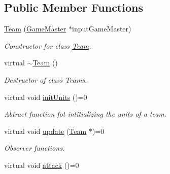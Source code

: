 \subsection*{Public Member Functions}
\begin{DoxyCompactItemize}
\item 
\hypertarget{class_team_a23a02be0438b0603c7f811a0605ce207}{}\hyperlink{class_team_a23a02be0438b0603c7f811a0605ce207}{Team} (\hyperlink{class_game_master}{Game\+Master} $\ast$input\+Game\+Master)\label{class_team_a23a02be0438b0603c7f811a0605ce207}

\begin{DoxyCompactList}\small\item\em Constructor for class \hyperlink{class_team}{Team}. \end{DoxyCompactList}\item 
\hypertarget{class_team_ab4218fddd612d52bab47bec4feeb49de}{}virtual \hyperlink{class_team_ab4218fddd612d52bab47bec4feeb49de}{$\sim$\+Team} ()\label{class_team_ab4218fddd612d52bab47bec4feeb49de}

\begin{DoxyCompactList}\small\item\em Destructor of class Teams. \end{DoxyCompactList}\item 
\hypertarget{class_team_adf453899d929b3e96cff02bb88502f57}{}virtual void \hyperlink{class_team_adf453899d929b3e96cff02bb88502f57}{init\+Units} ()=0\label{class_team_adf453899d929b3e96cff02bb88502f57}

\begin{DoxyCompactList}\small\item\em Abtract function fot intitializing the units of a team. \end{DoxyCompactList}\item 
\hypertarget{class_team_a77d30d9a1379c152e415dacd9459f162}{}virtual void \hyperlink{class_team_a77d30d9a1379c152e415dacd9459f162}{update} (\hyperlink{class_team}{Team} $\ast$)=0\label{class_team_a77d30d9a1379c152e415dacd9459f162}

\begin{DoxyCompactList}\small\item\em Observer functions. \end{DoxyCompactList}\item 
\hypertarget{class_team_a5b2230619d5f2889b8ec4a1c213d230c}{}virtual void \hyperlink{class_team_a5b2230619d5f2889b8ec4a1c213d230c}{attack} ()=0\label{class_team_a5b2230619d5f2889b8ec4a1c213d230c}


\end{DoxyCompactItemize}
